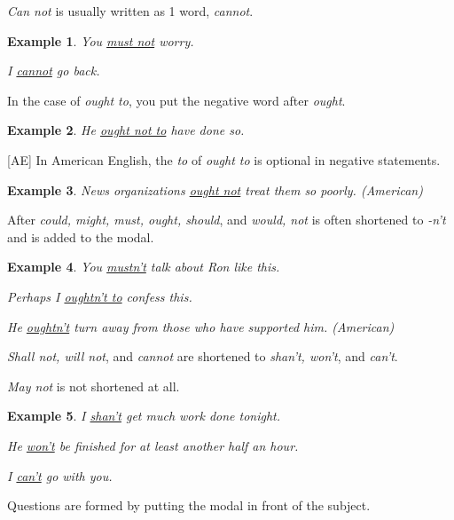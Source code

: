 \documentclass[oneside]{book}
\numberwithin{equation}{section}
\newtheorem{example}{Example}[section]
\begin{document}
\textit{Can not} is usually written as 1 word, \textit{cannot}.
\begin{example}
    You \underline{must not} worry.
    
    I \underline{cannot} go back.
\end{example}
In the case of \textit{ought to}, you put the negative word after \textit{ought}.
\begin{example}
    He \underline{ought not to} have done so.
\end{example}
[AE] In American English, the \textit{to} of \textit{ought to} is optional in negative statements.
\begin{example}
    News organizations \underline{ought not} treat them so poorly. (American)
\end{example}
After \textit{could, might, must, ought, should}, and \textit{would, not} is often shortened to \textit{-n't} and is added to the modal.
\begin{example}
    You \underline{mustn't} talk about Ron like this.
    
    Perhaps I \underline{oughtn't to} confess this.
    
    He \underline{oughtn't} turn away from those who have supported him. (American)
\end{example}
\textit{Shall not, will not}, and \textit{cannot} are shortened to \textit{shan't, won't}, and \textit{can't}.

\textit{May not} is not shortened at all.
\begin{example}
    I \underline{shan't} get much work done tonight.
    
    He \underline{won't} be finished for at least another half an hour.
    
    I \underline{can't} go with you.
\end{example}
%
\noindent{} Questions are formed by putting the modal in front of the subject.
\end{document}

